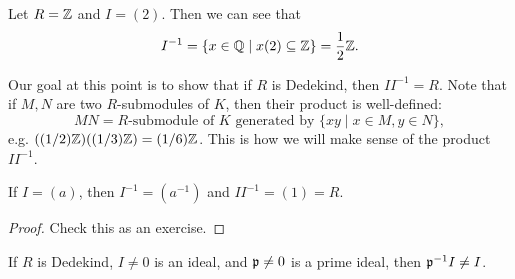 \begin{example}
  Let $R = \mathbb{Z}$ and $I = (2)$. Then we can
  see that
  \[
    I^{-1} = \{x \in \mathbb{Q} \mid x (2) \subseteq \mathbb{Z}\}
    = \frac{1}{2} \mathbb{Z}.
  \]
\end{example}

\begin{remark}
  Our goal at this point is to show that if $R$ is
  Dedekind, then $I I^{-1} = R$. Note that if
  $M, N$ are two $R$-submodules of $K$, then their
  product is well-defined:
  \[
    MN = \text{$R$-submodule of $K$ generated by } \{xy \mid x \in M, y \in N\},
  \]
  e.g. $((1 / 2)\mathbb{Z})((1 / 3)\mathbb{Z}) = (1 / 6)\mathbb{Z}$. This is
  how we will make sense of the product $II^{-1}$.
\end{remark}

\begin{lemma}
  If $I = (a)$, then $I^{-1} = (a^{-1})$ and
  $I I^{-1} = (1) = R$.
\end{lemma}

\begin{proof}
  Check this as an exercise.
\end{proof}

\begin{prop}\label{prop:dedekind}
  If $R$ is Dedekind, $I \ne 0$ is an ideal, and
  $\mathfrak{p} \ne 0$ is a prime ideal, then $\mathfrak{p}^{-1} I \ne I$.
\end{prop}


